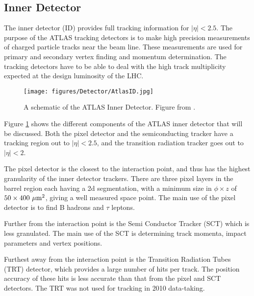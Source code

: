 \subsection{Inner Detector}
The inner detector (ID) provides full tracking information for $|\eta|<2.5$. 
The purpose of the ATLAS tracking detectors is to make high precision measurements of charged particle tracks near the beam line. 
These measurements are used for primary and secondary vertex finding and momentum determination. 
The tracking detectors have to be able to deal with the high track multiplicity expected at the design luminosity of the LHC.

\begin{figure}  
\centering  
\texttt{[image: figures/Detector/AtlasID.jpg]}
\caption[The ATLAS Inner Detector]{
A schematic of the ATLAS Inner Detector.
Figure from \cite{ref:ATLASExp}.
  \label{Det:ATLASID}
}
\end{figure}

Figure \ref{Det:ATLASID} shows the different components of the ATLAS inner detector that will be discussed. 
Both the pixel detector and the semiconducting tracker have a tracking region out to $|\eta|<2.5$, and the transition radiation tracker goes out to $|\eta|<2$. 

The pixel detector is the closest to the interaction point, and thus has the highest granularity of the inner detector trackers. 
There are three pixel layers in the barrel region each having a 2d segmentation, with a minimum size in $\phi\times z$ of $50\times400~\mu\rm{m}^2$, giving a well measured space point. 
The main use of the pixel detector is to find B hadrons and $\tau$ leptons. 

Further from the interaction point is the Semi Conductor Tracker (SCT) which is less granulated. 
The main use of the SCT is determining track momenta, impact parameters and vertex positions.

Furthest away from the interaction point is the Transition Radiation Tubes (TRT) detector, which provides a large number of hits per track. 
The position accuracy of these hits is less accurate than that from the pixel and SCT detectors.
The TRT was not used for tracking in 2010 data-taking.
